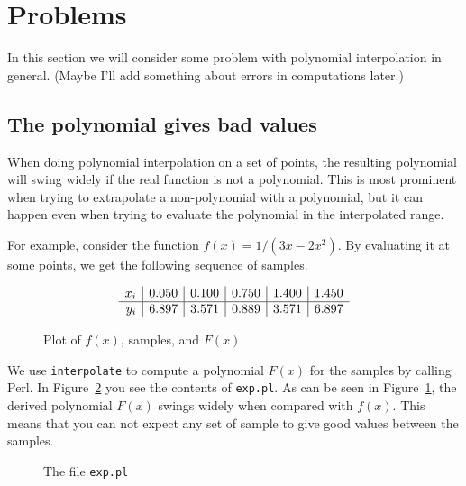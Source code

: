 \documentclass{article}		%
\begin{document}
\section*{Problems}

In this section we will consider some problem with polynomial
interpolation in general. (Maybe I'll add something about errors in
computations later.)

\subsection*{The polynomial gives bad values}

When doing polynomial interpolation on a set of points, the resulting
polynomial will swing widely if the real function is not a
polynomial. This is most prominent when trying to extrapolate a
non-polynomial with a polynomial, but it can happen even when trying
to evaluate the polynomial in the interpolated range.

For example, consider the function $f(x) = 1/(3x - 2x^2)$. By evaluating
it at some points, we get the following sequence of samples.

\begin{displaymath}
\begin{array}{r|r|r|r|r|r}
\strut x_i	&0.050	&0.100	&0.750	&1.400	&1.450 \\
\hline
\strut y_i	&6.897 	&3.571 	&0.889	&3.571	&6.897 \\
\end{array}
\end{displaymath}

\begin{figure}[t]
\begin{center}

\end{center}
\caption{Plot of $f(x)$, samples, and $F(x)$}\label{fig:exp.ps}
\end{figure}

We use \texttt{interpolate} to compute a polynomial $F(x)$ for the
samples by calling Perl. In Figure~\ref{fig:exp.pl} you see the
contents of \texttt{exp.pl}.
%
As can be seen in Figure~\ref{fig:exp.ps}, the derived polynomial
$F(x)$ swings widely when compared with $f(x)$. 
%
This means that you can not expect any set of sample to give good
values between the samples.

\begin{figure}[tb]
\begin{center}
\begin{minipage}{0.8\hsize}

\end{minipage}
\end{center}
\caption{The file \texttt{exp.pl}}\label{fig:exp.pl}
\end{figure}

% 
\end{document}
